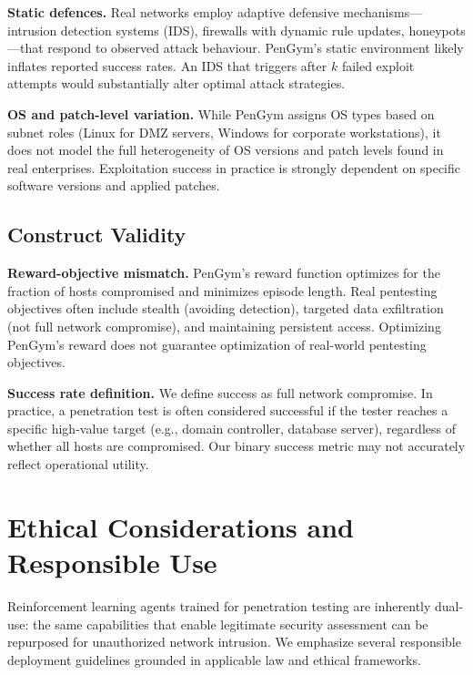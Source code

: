 \documentclass[conference]{IEEEtran}
\begin{document}
\textbf{Static defences.}  Real networks employ adaptive defensive
mechanisms---intrusion detection systems (IDS), firewalls with dynamic
rule updates, honeypots---that respond to observed attack behaviour.
PenGym's static environment likely inflates reported success rates.  An IDS
that triggers after $k$ failed exploit attempts would substantially
alter optimal attack strategies.

\textbf{OS and patch-level variation.}  While PenGym assigns
OS types based on subnet roles (Linux for DMZ servers, Windows for
corporate workstations), it does not model the full heterogeneity of
OS versions and patch levels found in real enterprises.  Exploitation
success in practice is strongly dependent on specific software versions
and applied patches.

\subsection{Construct Validity}

\textbf{Reward-objective mismatch.}  PenGym's reward function optimizes for
the fraction of hosts compromised and minimizes episode length.  Real
pentesting objectives often include stealth (avoiding detection),
targeted data exfiltration (not full network compromise), and
maintaining persistent access.  Optimizing PenGym's reward does not
guarantee optimization of real-world pentesting objectives.

\textbf{Success rate definition.}  We define success as full network
compromise.  In practice, a penetration test is often considered
successful if the tester reaches a specific high-value target
(e.g., domain controller, database server), regardless of whether
all hosts are compromised.  Our binary success metric may not
accurately reflect operational utility.

\section{Ethical Considerations and Responsible Use}
\label{sec:ethics}

Reinforcement learning agents trained for penetration testing are
inherently dual-use: the same capabilities that enable legitimate
security assessment can be repurposed for unauthorized network
intrusion.  We emphasize several responsible deployment guidelines
grounded in applicable law and ethical frameworks.
\end{document}

